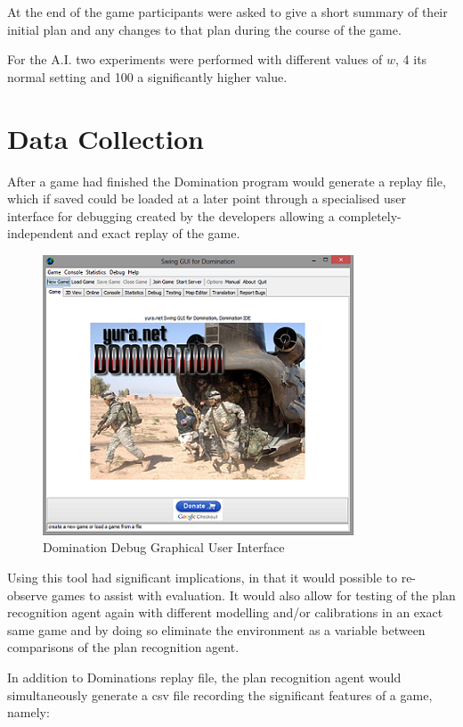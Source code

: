 \documentclass[parskip]{cs4rep}
\begin{document}
At the end of the game participants were asked to give a short summary of their initial plan and any changes to that plan during the course of the game.

For the A.I. two experiments were performed with different values of $w$, 4 its normal setting and 100 a significantly higher value.

\newpage

\section{Data Collection}

After a game had finished the Domination program would generate a replay file, which if saved could be loaded at a later point through a specialised user interface for debugging created by the developers allowing a completely-independent and exact replay of the game.

\begin{figure}[h]
\centerline{
\includegraphics{images/domination-debug-gui.png}
}
\caption{Domination Debug Graphical User Interface}
\label{fig:dom-debug-gui}
\end{figure} 

Using this tool had significant implications, in that it would possible to re-observe games to assist with evaluation. It would also allow for testing of the plan recognition agent again with different modelling and/or calibrations in an exact same game and by doing so eliminate the environment as a variable between comparisons of the plan recognition agent.

In addition to Dominations replay file, the plan recognition agent would simultaneously generate a csv file recording the significant features of a game, namely:
\end{document}
